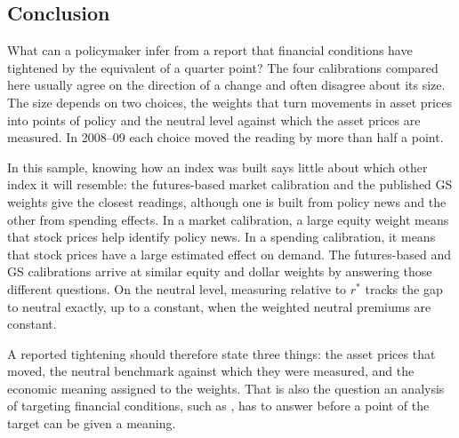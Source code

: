 \subsection{Conclusion}\label{sec:conclusion}
What can a policymaker infer from a report that financial conditions have tightened by the equivalent of a quarter point? The four calibrations compared here usually agree on the direction of a change and often disagree about its size. The size depends on two choices, the weights that turn movements in asset prices into points of policy and the neutral level against which the asset prices are measured. In 2008--09 each choice moved the reading by more than half a point.

In this sample, knowing how an index was built says little about which other index it will resemble: the futures-based market calibration and the published GS weights give the closest readings, although one is built from policy news and the other from spending effects. In a market calibration, a large equity weight means that stock prices help identify policy news. In a spending calibration, it means that stock prices have a large estimated effect on demand. The futures-based and GS calibrations arrive at similar equity and dollar weights by answering those different questions. On the neutral level, measuring relative to $r^*$ tracks the gap to neutral exactly, up to a constant, when the weighted neutral premiums are constant.

A reported tightening should therefore state three things: the asset prices that moved, the neutral benchmark against which they were measured, and the economic meaning assigned to the weights. That is also the question an analysis of targeting financial conditions, such as \citet{caballero2026b}, has to answer before a point of the target can be given a meaning.
